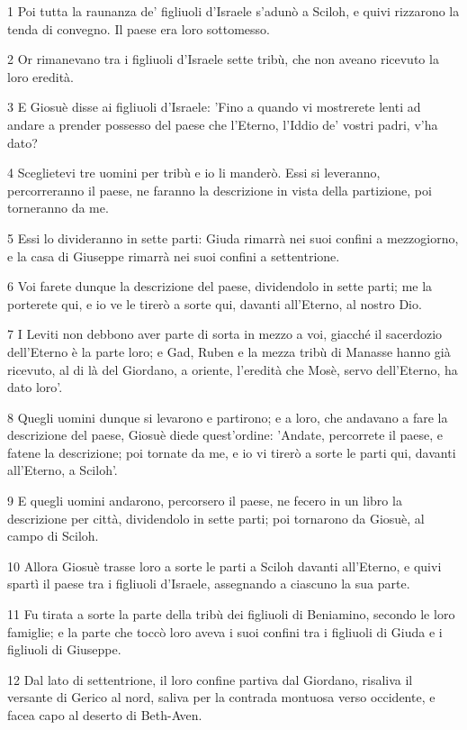 \par 1 Poi tutta la raunanza de' figliuoli d'Israele s'adunò a Sciloh, e quivi rizzarono la tenda di convegno. Il paese era loro sottomesso.
\par 2 Or rimanevano tra i figliuoli d'Israele sette tribù, che non aveano ricevuto la loro eredità.
\par 3 E Giosuè disse ai figliuoli d'Israele: 'Fino a quando vi mostrerete lenti ad andare a prender possesso del paese che l'Eterno, l'Iddio de' vostri padri, v'ha dato?
\par 4 Sceglietevi tre uomini per tribù e io li manderò. Essi si leveranno, percorreranno il paese, ne faranno la descrizione in vista della partizione, poi torneranno da me.
\par 5 Essi lo divideranno in sette parti: Giuda rimarrà nei suoi confini a mezzogiorno, e la casa di Giuseppe rimarrà nei suoi confini a settentrione.
\par 6 Voi farete dunque la descrizione del paese, dividendolo in sette parti; me la porterete qui, e io ve le tirerò a sorte qui, davanti all'Eterno, al nostro Dio.
\par 7 I Leviti non debbono aver parte di sorta in mezzo a voi, giacché il sacerdozio dell'Eterno è la parte loro; e Gad, Ruben e la mezza tribù di Manasse hanno già ricevuto, al di là del Giordano, a oriente, l'eredità che Mosè, servo dell'Eterno, ha dato loro'.
\par 8 Quegli uomini dunque si levarono e partirono; e a loro, che andavano a fare la descrizione del paese, Giosuè diede quest'ordine: 'Andate, percorrete il paese, e fatene la descrizione; poi tornate da me, e io vi tirerò a sorte le parti qui, davanti all'Eterno, a Sciloh'.
\par 9 E quegli uomini andarono, percorsero il paese, ne fecero in un libro la descrizione per città, dividendolo in sette parti; poi tornarono da Giosuè, al campo di Sciloh.
\par 10 Allora Giosuè trasse loro a sorte le parti a Sciloh davanti all'Eterno, e quivi spartì il paese tra i figliuoli d'Israele, assegnando a ciascuno la sua parte.
\par 11 Fu tirata a sorte la parte della tribù dei figliuoli di Beniamino, secondo le loro famiglie; e la parte che toccò loro aveva i suoi confini tra i figliuoli di Giuda e i figliuoli di Giuseppe.
\par 12 Dal lato di settentrione, il loro confine partiva dal Giordano, risaliva il versante di Gerico al nord, saliva per la contrada montuosa verso occidente, e facea capo al deserto di Beth-Aven.
